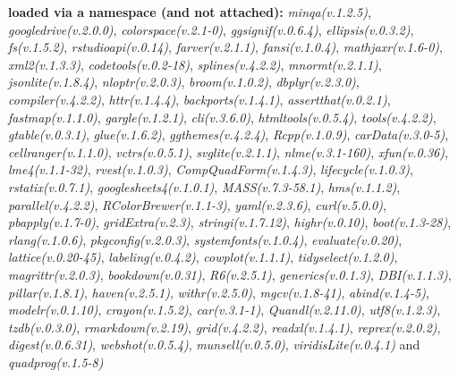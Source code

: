 \documentclass[
  bookmarksnumbered]{article}
\begin{document}
\textbf{loaded via a namespace (and not attached):}
\emph{minqa(v.1.2.5)}, \emph{googledrive(v.2.0.0)}, \emph{colorspace(v.2.1-0)}, \emph{ggsignif(v.0.6.4)}, \emph{ellipsis(v.0.3.2)}, \emph{fs(v.1.5.2)}, \emph{rstudioapi(v.0.14)}, \emph{farver(v.2.1.1)}, \emph{fansi(v.1.0.4)}, \emph{mathjaxr(v.1.6-0)}, \emph{xml2(v.1.3.3)}, \emph{codetools(v.0.2-18)}, \emph{splines(v.4.2.2)}, \emph{mnormt(v.2.1.1)}, \emph{jsonlite(v.1.8.4)}, \emph{nloptr(v.2.0.3)}, \emph{broom(v.1.0.2)}, \emph{dbplyr(v.2.3.0)}, \emph{compiler(v.4.2.2)}, \emph{httr(v.1.4.4)}, \emph{backports(v.1.4.1)}, \emph{assertthat(v.0.2.1)}, \emph{fastmap(v.1.1.0)}, \emph{gargle(v.1.2.1)}, \emph{cli(v.3.6.0)}, \emph{htmltools(v.0.5.4)}, \emph{tools(v.4.2.2)}, \emph{gtable(v.0.3.1)}, \emph{glue(v.1.6.2)}, \emph{ggthemes(v.4.2.4)}, \emph{Rcpp(v.1.0.9)}, \emph{carData(v.3.0-5)}, \emph{cellranger(v.1.1.0)}, \emph{vctrs(v.0.5.1)}, \emph{svglite(v.2.1.1)}, \emph{nlme(v.3.1-160)}, \emph{xfun(v.0.36)}, \emph{lme4(v.1.1-32)}, \emph{rvest(v.1.0.3)}, \emph{CompQuadForm(v.1.4.3)}, \emph{lifecycle(v.1.0.3)}, \emph{rstatix(v.0.7.1)}, \emph{googlesheets4(v.1.0.1)}, \emph{MASS(v.7.3-58.1)}, \emph{hms(v.1.1.2)}, \emph{parallel(v.4.2.2)}, \emph{RColorBrewer(v.1.1-3)}, \emph{yaml(v.2.3.6)}, \emph{curl(v.5.0.0)}, \emph{pbapply(v.1.7-0)}, \emph{gridExtra(v.2.3)}, \emph{stringi(v.1.7.12)}, \emph{highr(v.0.10)}, \emph{boot(v.1.3-28)}, \emph{rlang(v.1.0.6)}, \emph{pkgconfig(v.2.0.3)}, \emph{systemfonts(v.1.0.4)}, \emph{evaluate(v.0.20)}, \emph{lattice(v.0.20-45)}, \emph{labeling(v.0.4.2)}, \emph{cowplot(v.1.1.1)}, \emph{tidyselect(v.1.2.0)}, \emph{magrittr(v.2.0.3)}, \emph{bookdown(v.0.31)}, \emph{R6(v.2.5.1)}, \emph{generics(v.0.1.3)}, \emph{DBI(v.1.1.3)}, \emph{pillar(v.1.8.1)}, \emph{haven(v.2.5.1)}, \emph{withr(v.2.5.0)}, \emph{mgcv(v.1.8-41)}, \emph{abind(v.1.4-5)}, \emph{modelr(v.0.1.10)}, \emph{crayon(v.1.5.2)}, \emph{car(v.3.1-1)}, \emph{Quandl(v.2.11.0)}, \emph{utf8(v.1.2.3)}, \emph{tzdb(v.0.3.0)}, \emph{rmarkdown(v.2.19)}, \emph{grid(v.4.2.2)}, \emph{readxl(v.1.4.1)}, \emph{reprex(v.2.0.2)}, \emph{digest(v.0.6.31)}, \emph{webshot(v.0.5.4)}, \emph{munsell(v.0.5.0)}, \emph{viridisLite(v.0.4.1)} and \emph{quadprog(v.1.5-8)}
\end{document}
